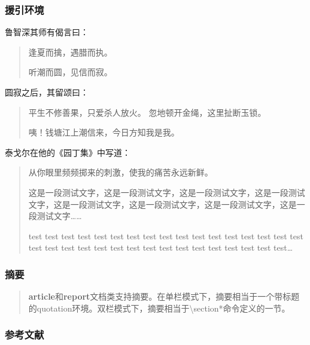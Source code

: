 \documentclass{ctexart}
\begin{document}
        \subsubsection{援引环境}
            鲁智深其师有偈言曰：
            \begin{quote}
                逢夏而擒，遇腊而执。

                听潮而圆，见信而寂。
            \end{quote}

            圆寂之后，其留颂曰：
            \begin{quotation}
                平生不修善果，只爱杀人放火。
                忽地顿开金绳，这里扯断玉锁。

                咦！钱塘江上潮信来，今日方知我是我。
            \end{quotation}

            泰戈尔在他的《园丁集》中写道：
            \begin{verse}
                从你眼里频频掷来的刺激，使我的痛苦永远新鲜。

                这是一段测试文字，这是一段测试文字，这是一段测试文字，这是一段测试文字，这是一段测试文字，这是一段测试文字，这是一段测试文字，这是一段测试文字……

                test test test test test test test test test test test test test test test test test test test test test test test test test test test test test test test test test\ldots
            \end{verse}

        \subsubsection{摘要}
            \renewcommand{\abstractname}{这是摘要} %
            \begin{abstract}
                \textbf{article}和\textbf{report}文档类支持摘要。在单栏模式下，摘要相当于一个带标题的quotation环境。双栏模式下，摘要相当于\textbackslash section*命令定义的一节。
            \end{abstract}
        
        \subsubsection{参考文献}
\end{document}

